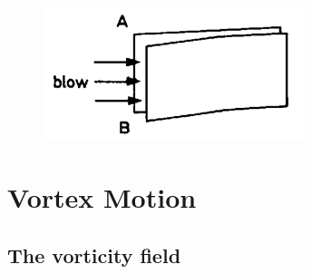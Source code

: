 \documentclass[twoside,a4paper,11pt]{report}
\begin{document}
\begin{figure}
\centerline{\includegraphics[width=3in]{Section34.pdf}}
\label{fig4}
\end{figure}



\chapter{Vortex Motion}
\section{The vorticity field}
\end{document}
